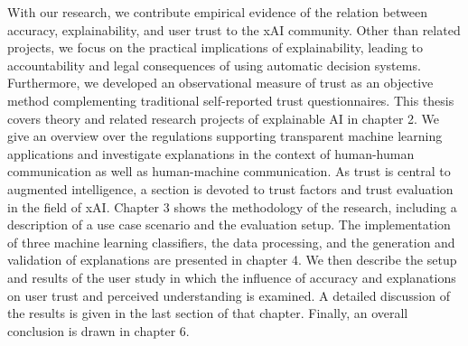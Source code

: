 With our research, we contribute empirical evidence of the relation between accuracy, explainability, and user trust to the xAI community. Other than related projects, we focus on the practical implications of explainability, leading to accountability and legal consequences of using automatic decision systems. Furthermore, we developed an observational measure of trust as an objective method complementing traditional self-reported trust questionnaires.\medskip \newline
This thesis covers theory and related research projects of explainable AI in chapter 2. We give an overview over the regulations supporting transparent machine learning applications and investigate explanations in the context of human-human communication as well as human-machine communication. As trust is central to augmented intelligence, a section is devoted to trust factors and trust evaluation in the field of xAI. Chapter 3 shows the methodology of the research, including a description of a use case scenario and the evaluation setup. The implementation of three machine learning classifiers, the data processing, and the generation and validation of explanations are presented in chapter 4. We then describe the setup and results of the user study in which the influence of accuracy and explanations on user trust and perceived understanding is examined. A detailed discussion of the results is given in the last section of that chapter. Finally, an overall conclusion is drawn in chapter 6. 



